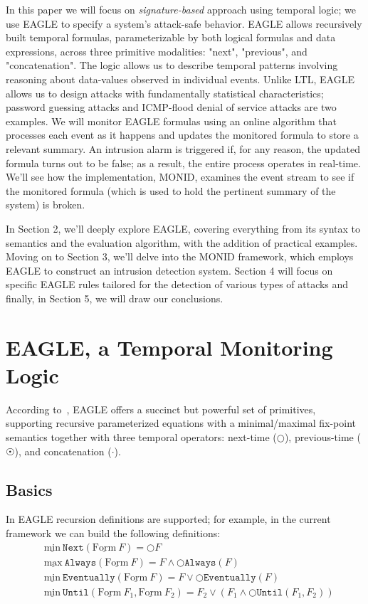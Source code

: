 \documentclass[english]{article}
\begin{document}
In this paper we will focus on \textit{signature-based} approach using temporal logic; we use EAGLE\cite{barringer2004rule,barringer2003eagle} to specify a system's attack-safe behavior. EAGLE allows recursively built temporal formulas, parameterizable by both logical formulas and data expressions, across three primitive modalities: "next", "previous", and "concatenation". The logic allows us to describe temporal patterns involving reasoning about data-values observed in individual events. Unlike LTL, EAGLE allows us to design attacks with fundamentally statistical characteristics; password guessing attacks and ICMP-flood denial of service attacks are two examples. We will monitor EAGLE formulas using an online algorithm that processes each event as it happens and updates the monitored formula to store a relevant summary. An intrusion alarm is triggered if, for any reason, the updated formula turns out to be false; as a result, the entire process operates in real-time. We'll see how the implementation, MONID, examines the event stream to see if the monitored formula (which is used to hold the pertinent summary of the system) is broken.

In Section 2, we'll deeply explore EAGLE, covering everything from its syntax to semantics and the evaluation algorithm, with the addition of practical examples. Moving on to Section 3, we'll delve into the MONID framework, which employs EAGLE to construct an intrusion detection system. Section 4 will focus on specific EAGLE rules tailored for the detection of various types of attacks and finally, in Section 5, we will draw our conclusions.

\section{EAGLE, a Temporal Monitoring Logic}
According to~\cite{barringer2004program}, EAGLE offers a succinct but powerful set of primitives, supporting recursive parameterized equations with a minimal/maximal fix-point semantics together with three temporal operators: next-time ($\bigcirc$), previous-time ($\astrosun$), and concatenation ($\cdot$).
\subsection{Basics}\label{sec:ltl}
In EAGLE recursion definitions are supported; for example, in the current framework we can build the following definitions:
\begin{align*}
& \underline{\text{min}}\ \mathtt{Next}(\underline{\text{Form}}\ F) = \bigcirc F \\
& \underline{\text{max}}\ \mathtt{Always}(\underline{\text{Form}}\ F) = F \land \bigcirc \mathtt{Always}(F) \\
& \underline{\text{min}}\ \mathtt{Eventually}(\underline{\text{Form}}\ F) = F \lor \bigcirc \mathtt{Eventually}(F) \\
& \underline{\text{min}}\ \mathtt{Until}(\underline{\text{Form}}\ F_1, \underline{\text{Form}}\ F_2) = F_2 \lor (F_1 \land \bigcirc \mathtt{Until}(F_1,F_2))
\end{align*}
\end{document}
